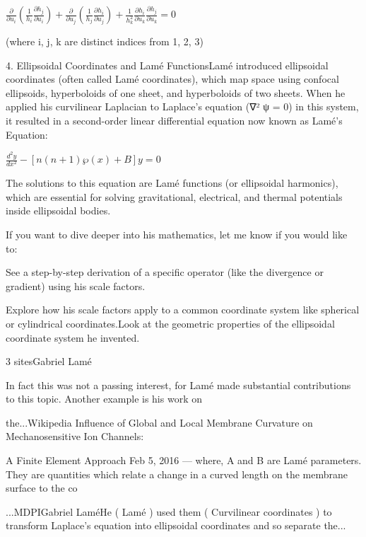 \documentclass[11pt,a4paper,draft]{amsart}
\begin{document}
\(\frac{\partial }{\partial u_{i}}\left(\frac{1}{h_{i}}\frac{\partial h_{j}}{\partial u_{i}}\right)+\frac{\partial }{\partial u_{j}}\left(\frac{1}{h_{j}}\frac{\partial h_{i}}{\partial u_{j}}\right)+\frac{1}{h_{k}^{2}}\frac{\partial h_{i}}{\partial u_{k}}\frac{\partial h_{j}}{\partial u_{k}}=0\)

(where i, j, k are distinct indices from 1, 2, 3)

4. Ellipsoidal Coordinates and Lamé FunctionsLamé introduced ellipsoidal coordinates (often called Lamé coordinates), which map space using confocal ellipsoids, hyperboloids of one sheet, and hyperboloids of two sheets. When he applied his curvilinear Laplacian to Laplace's equation (∇² ψ = 0) in this system, it resulted in a second-order linear differential equation now known as Lamé's Equation:

\(\frac{d^{2}y}{dx^{2}}-[n(n+1)\wp (x)+B]y=0\)

The solutions to this equation are Lamé functions (or ellipsoidal harmonics), which are essential for solving gravitational, electrical, and thermal potentials inside ellipsoidal bodies.


If you want to dive deeper into his mathematics, let me know if you would like to:

See a step-by-step derivation of a specific operator (like the divergence or gradient) using his scale factors.

Explore how his scale factors apply to a common coordinate system like spherical or cylindrical coordinates.Look at the geometric properties of the ellipsoidal coordinate system he invented.

3 sitesGabriel Lamé

In fact this was not a passing interest, for Lamé made substantial contributions to this topic. Another example is his work on

the...Wikipedia Influence of Global and Local Membrane Curvature on Mechanosensitive Ion Channels:

A Finite Element Approach Feb 5, 2016 — where, A and B are Lamé parameters.
They are quantities which relate a change in a curved length on the membrane surface to the co

...MDPIGabriel LaméHe ( Lamé ) used them ( Curvilinear coordinates ) to
transform Laplace's equation into ellipsoidal coordinates and so separate the...
\end{document}

